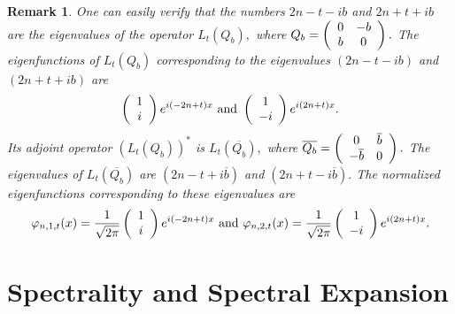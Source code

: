 \documentclass{article}%
\newtheorem{remark}{Remark}
\begin{document}
\begin{remark}
One can easily verify that the numbers $2n-t-ib$ and $2n+t+ib$ are the
eigenvalues of the operator $L_{t}(Q_{b}),$ where $Q_{b}=\left(
\begin{array}
[c]{cc}%
0 & -b\\
b & 0
\end{array}
\right)  .$ The eigenfunctions of $L_{t}(Q_{b})$ corresponding to the
eigenvalues $(2n-t-ib)$ and $(2n+t+ib)$ are
\[
\left(
\begin{array}
[c]{c}%
1\\
i
\end{array}
\right)  e^{i(-2n+t)x}\text{ and }\left(
\begin{array}
[c]{c}%
1\\
-i
\end{array}
\right)  e^{i(2n+t)x}.
\]
Its adjoint operator $\left(  L_{t}(Q_{b})\right)  ^{\ast}$ is $L_{t}%
(\overline{Q_{b}}),$ where $\overline{Q_{b}}=\left(
\begin{array}
[c]{cc}%
0 & \overline{b}\\
-\overline{b} & 0
\end{array}
\right)  .$ The eigenvalues of $L_{t}(\overline{Q_{b}})$ are $(2n-t+i\overline
{b})$ and $(2n+t-i\overline{b}).$ The normalized eigenfunctions corresponding
to these eigenvalues are
\[
\varphi_{n,1,t}(x)=\frac{1}{\sqrt{2\pi}}\left(
\begin{array}
[c]{c}%
1\\
i
\end{array}
\right)  e^{i(-2n+t)x}\text{ and }\varphi_{n,2,t}(x)=\frac{1}{\sqrt{2\pi}%
}\left(
\begin{array}
[c]{c}%
1\\
-i
\end{array}
\right)  e^{i(2n+t)x}.
\]

\end{remark}

\section{Spectrality and Spectral Expansion}
\end{document}
